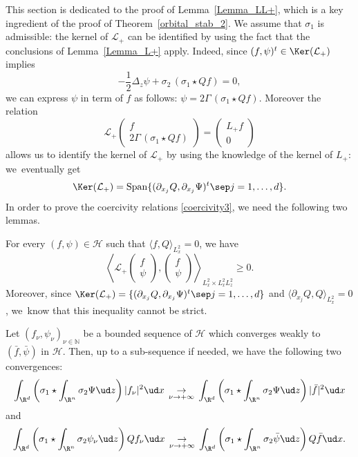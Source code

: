 This section is dedicated to the proof of Lemma~\ref{Lemma_LL+}, which is a key ingredient of the proof of Theorem~\ref{orbital_stab_2}.
We assume that $\sigma_1$ is admissible:
the kernel of $\mathcal{L}_{+}$ can be identified by using
the fact that the conclusions of
Lemma~\ref{Lemma_L+} apply. Indeed, since $(f,\psi)^{t}\in\Ker(\mathcal{L}_{+})$ implies
\[
-\frac{1}{2}\Delta_{z}\psi+\sigma_{2}\,(\sigma_{1}\star Qf)=0,
\]
we can express $\psi$ in term of $f$ as follows: $\psi=2\Gamma\,(\sigma_{1}\star Qf)$. Moreover the relation
\begin{equation}\label{relation_LL+_L+}
\mathcal{L}_{+}\begin{pmatrix} f \\ 2\Gamma\,(\sigma_{1}\star Qf) \end{pmatrix}=\begin{pmatrix} L_{+}f\\0 \end{pmatrix}
\end{equation}
allows us to identify the kernel of $\mathcal{L}_{+}$
by using the knowledge of the kernel of $L_{+}$: we~eventually get
\[
\Ker(\mathcal{L}_{+})=\mathrm{Span}\{(\partial_{x_{j}}Q,\partial_{x_{j}}\Psi)^{t}\sep j=1,\ldots,d\}.
\]
In order to prove the coercivity relations \eqref{coercivity3}, we need the following two lemmas.

\begin{lemma}\label{positivity_LL+}
For every $(f,\psi)\in\mathscr{H}$ such that $\langle f,Q\rangle_{L_{x}^{2}}=0$, we have
\[
\left\langle\mathcal{L}_{+}\begin{pmatrix} f\\\psi \end{pmatrix},\begin{pmatrix} f\\\psi \end{pmatrix}\right\rangle_{L_{x}^{2}\times L_{x}^{2}L_{z}^{2}}\geq 0.
\]
Moreover, since $\Ker(\mathcal{L}_{+})=\{(\partial_{x_{j}}Q,\partial_{x_{j}}\Psi)^{t}\sep j=1,\ldots,d\}$ and $\langle \partial_{x_{j}}Q,Q\rangle_{L_{x}^{2}}=0$, we~know that this inequality cannot be strict.
\end{lemma}

\begin{lemma}\label{compactness_LL+}
Let $(f_{\nu},\psi_{\nu})_{\nu\in\mathbb N}$ be a bounded sequence of $\mathscr{H}$ which converges weakly to $(\bar{f},\bar{\psi})$ in $\mathscr{H}$. Then, up to a sub-sequence if needed, we have the following two convergences:
\begin{equation}\label{lcv1}
\int_{\R^{d}}\left(\sigma_{1}\star\int_{\R^{n}}\sigma_{2}\Psi\ud z\right)|f_{\nu}|^{2}\ud x\,\underset{\nu\to+\infty}{\to}\,\int_{\R^{d}}\left(\sigma_{1}\star\int_{\R^{n}}\sigma_{2}\Psi\ud z\right)|\bar{f}|^{2}\ud x
\end{equation}
and
\begin{equation}\label{lcv2}
\int_{\R^{d}}\left(\sigma_{1}\star\int_{\R^{n}}\sigma_{2}\psi_{\nu}\ud z\right)Qf_{\nu}\ud x\,\underset{\nu\to +\infty}{\to}\,\int_{\R^{d}}\left(\sigma_{1}\star\int_{\R^{n}}\sigma_{2}\bar{\psi}\ud z\right)Q\bar{f}\ud x.
\end{equation}
\end{lemma}

